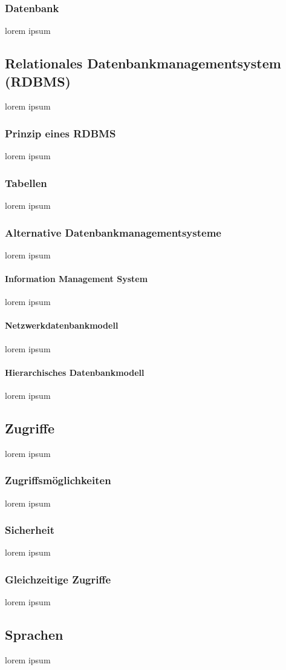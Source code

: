 \documentclass[10pt,a4paper]{report}
\begin{document}
\subsubsection{Datenbank}
lorem ipsum
\subsection{Relationales Datenbankmanagementsystem (RDBMS)}
lorem ipsum
\subsubsection{Prinzip eines RDBMS}
lorem ipsum
\subsubsection{Tabellen}
lorem ipsum
\subsubsection{Alternative Datenbankmanagementsysteme}
lorem ipsum
\paragraph{Information Management System}
lorem ipsum
\paragraph{Netzwerkdatenbankmodell}
lorem ipsum
\paragraph{Hierarchisches Datenbankmodell}
lorem ipsum
\subsection{Zugriffe}
lorem ipsum
\subsubsection{Zugriffsmöglichkeiten}
lorem ipsum
\subsubsection{Sicherheit}
lorem ipsum
\subsubsection{Gleichzeitige Zugriffe}
lorem ipsum 
\subsection{Sprachen}
lorem ipsum
\end{document}
